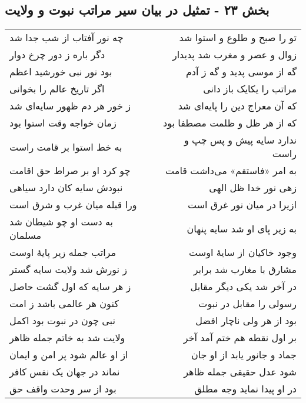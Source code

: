 \begin{center}
\section*{بخش ۲۳ - تمثیل در بیان سیر مراتب نبوت و ولایت}
\label{sec:sh023}
\begin{longtable}{l p{0.5cm} r}
چه نور آفتاب از شب جدا شد
&&
تو را صبح و طلوع و استوا شد
\\
دگر باره ز دور چرخ دوار
&&
زوال و عصر و مغرب شد پدیدار
\\
بود نور نبی خورشید اعظم
&&
گه از موسی پدید و گه ز آدم
\\
اگر تاریخ عالم را بخوانی
&&
مراتب را یکایک باز دانی
\\
ز خور هر دم ظهور سایه‌ای شد
&&
که آن معراج دین را پایه‌ای شد
\\
زمان خواجه وقت استوا بود
&&
که از هر ظل و ظلمت مصطفا بود
\\
به خط استوا بر قامت راست
&&
ندارد سایه پیش و پس چپ و راست
\\
چو کرد او بر صراط حق اقامت
&&
به امر «فاستقم» می‌داشت قامت
\\
نبودش سایه کان دارد سیاهی
&&
زهی نور خدا ظل الهی
\\
ورا قبله میان غرب و شرق است
&&
ازیرا در میان نور غرق است
\\
به دست او چو شیطان شد مسلمان
&&
به زیر پای او شد سایه پنهان
\\
مراتب جمله زیر پایهٔ اوست
&&
وجود خاکیان از سایهٔ اوست
\\
ز نورش شد ولایت سایه گستر
&&
مشارق با مغارب شد برابر
\\
ز هر سایه که اول گشت حاصل
&&
در آخر شد یکی دیگر مقابل
\\
کنون هر عالمی باشد ز امت
&&
رسولی را مقابل در نبوت
\\
نبی چون در نبوت بود اکمل
&&
بود از هر ولی ناچار افضل
\\
ولایت شد به خاتم جمله ظاهر
&&
بر اول نقطه هم ختم آمد آخر
\\
از او عالم شود پر امن و ایمان
&&
جماد و جانور یابد از او جان
\\
نماند در جهان یک نفس کافر
&&
شود عدل حقیقی جمله ظاهر
\\
بود از سر وحدت واقف حق
&&
در او پیدا نماید وجه مطلق
\\
\end{longtable}
\end{center}
